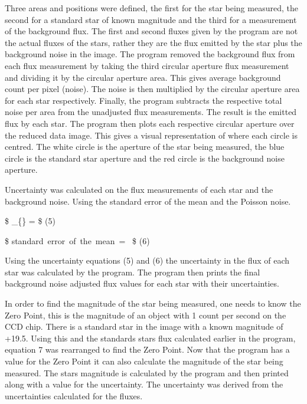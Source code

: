 \documentclass[11pt]{article}
\begin{document}
Three areas and positions were defined, the first for the star being
measured, the second for a standard star of known magnitude and the
third for a measurement of the background flux. The first and second
fluxes given by the program are not the actual fluxes of the stars,
rather they are the flux emitted by the star plus the background noise
in the image. The program removed the background flux from each flux
measurement by taking the third circular aperture flux measurement and
dividing it by the circular aperture area. This gives average background
count per pixel (noise). The noise is then multiplied by the circular
aperture area for each star respectively. Finally, the program subtracts
the respective total noise per area from the unadjusted flux
measurements. The result is the emitted flux by each star. The program
then plots each respective circular aperture over the reduced data
image. This gives a visual representation of where each circle is
centred. The white circle is the aperture of the star being measured,
the blue circle is the standard star aperture and the red circle is the
background noise aperture.

Uncertainty was calculated on the flux measurements of each star and the
background noise. Using the standard error of the mean and the Poisson
noise.

\$ \sigma\_\{\} =
\$
(5)

\$ standard~error~of~the~mean~=~ \$ (6)

Using the uncertainty equations (5) and (6) the uncertainty in the flux
of each star was calculated by the program. The program then prints the
final background noise adjusted flux values for each star with their
uncertainties.

In order to find the magnitude of the star being measured, one needs to
know the Zero Point, this is the magnitude of an object with 1 count per
second on the CCD chip. There is a standard star in the image with a
known magnitude of +19.5. Using this and the standards stars flux
calculated earlier in the program, equation 7 was rearranged to find the
Zero Point. Now that the program has a value for the Zero Point it can
also calculate the magnitude of the star being measured. The stars
magnitude is calculated by the program and then printed along with a
value for the uncertainty. The uncertainty was derived from the
uncertainties calculated for the fluxes.
\end{document}
